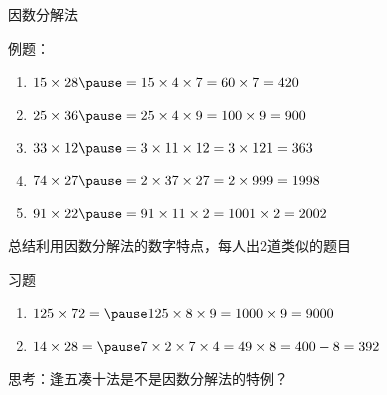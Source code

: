 \documentclass[aspectratio=169]{ctexbeamer} %
\date{\today}
\begin{document}
\begin{frame}[t]{因数分解法}
\begin{spacing}{1.2}
\normalsize
例题：
\begin{enumerate}[label={\arabic*.}]
\item $15 \times 28 \pause = 15 \times 4 \times 7 = 60 \times 7 = 420$
\item $25 \times 36 \pause = 25 \times 4 \times 9 = 100 \times 9 = 900$
\item $33 \times 12 \pause = 3 \times 11 \times 12 = 3 \times 121 = 363$
\item $74 \times 27 \pause = 2 \times 37 \times 27 = 2 \times 999 = 1998$
\item $91 \times 22 \pause = 91 \times 11 \times 2 = 1001 \times 2 = 2002$
\end{enumerate}
\alert{总结利用因数分解法的数字特点，每人出2道类似的题目} \\
\end{spacing}
\end{frame}

\begin{frame}[t]{习题}
\begin{spacing}{1.2}
\normalsize
\begin{enumerate}[label={\arabic*.}]
\item $125 \times 72 = \pause 125 \times 8 \times 9 = 1000 \times 9 = 9000$
\item $14 \times 28 = \pause 7 \times 2 \times 7 \times 4 = 49 \times 8 = 400 - 8 = 392$

\end{enumerate}
\alert{思考：逢五凑十法是不是因数分解法的特例？}
\end{spacing}
\end{frame}
\end{document}
